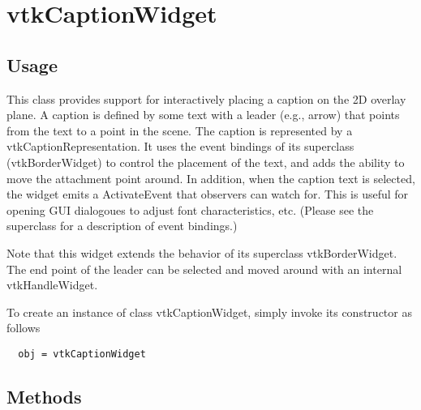 \section{vtkCaptionWidget}

\subsection{Usage}

 This class provides support for interactively placing a caption on the 2D
 overlay plane. A caption is defined by some text with a leader (e.g.,
 arrow) that points from the text to a point in the scene. The caption is
 represented by a vtkCaptionRepresentation. It uses the event bindings of
 its superclass (vtkBorderWidget) to control the placement of the text, and
 adds the ability to move the attachment point around. In addition, when
 the caption text is selected, the widget emits a ActivateEvent that
 observers can watch for. This is useful for opening GUI dialogoues to
 adjust font characteristics, etc. (Please see the superclass for a
 description of event bindings.)

 Note that this widget extends the behavior of its superclass 
 vtkBorderWidget. The end point of the leader can be selected and
 moved around with an internal vtkHandleWidget.

To create an instance of class vtkCaptionWidget, simply
invoke its constructor as follows
\begin{verbatim}
  obj = vtkCaptionWidget
\end{verbatim}
\subsection{Methods}

